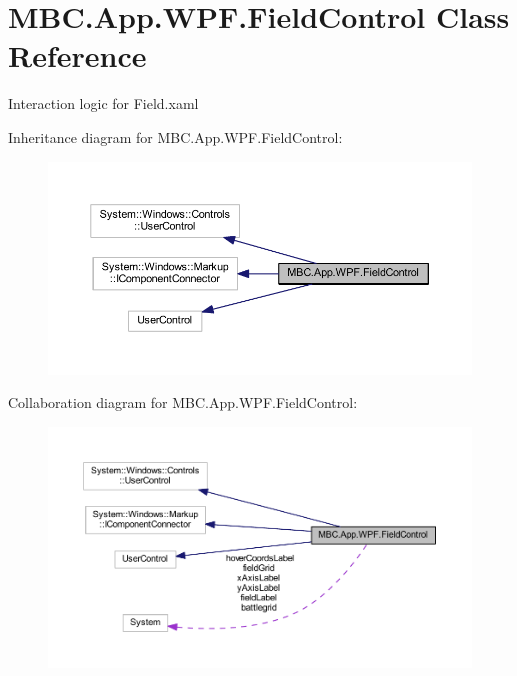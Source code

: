 \hypertarget{class_m_b_c_1_1_app_1_1_w_p_f_1_1_field_control}{\section{M\-B\-C.\-App.\-W\-P\-F.\-Field\-Control Class Reference}
\label{class_m_b_c_1_1_app_1_1_w_p_f_1_1_field_control}
}


Interaction logic for Field.\-xaml  




Inheritance diagram for M\-B\-C.\-App.\-W\-P\-F.\-Field\-Control\-:
\nopagebreak
\begin{figure}[H]
\begin{center}
\leavevmode
\includegraphics[width=350pt]{class_m_b_c_1_1_app_1_1_w_p_f_1_1_field_control__inherit__graph}
\end{center}
\end{figure}


Collaboration diagram for M\-B\-C.\-App.\-W\-P\-F.\-Field\-Control\-:
\nopagebreak
\begin{figure}[H]
\begin{center}
\leavevmode
\includegraphics[width=350pt]{class_m_b_c_1_1_app_1_1_w_p_f_1_1_field_control__coll__graph}
\end{center}
\end{figure}
